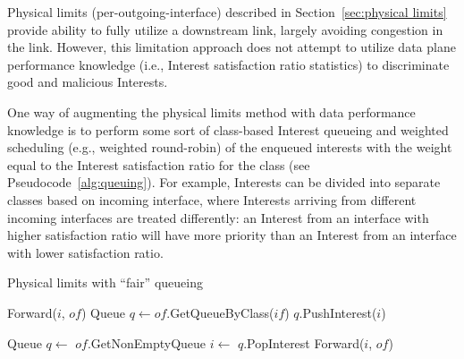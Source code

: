 
Physical limits (per-outgoing-interface) described in Section~\ref{sec:physical limits} provide ability to fully utilize a downstream link, largely avoiding congestion in the link.
However, this limitation approach does not attempt to utilize data plane performance knowledge (i.e., Interest satisfaction ratio statistics) to discriminate good and malicious Interests.

One way of augmenting the physical limits method with data performance knowledge is to perform some sort of class-based Interest queueing and weighted scheduling (e.g., weighted round-robin) of the enqueued interests with the weight equal to the Interest satisfaction ratio for the class (see Pseudocode~\ref{alg:queuing}).
For example, Interests can be divided into separate classes based on incoming interface, where Interests arriving from different incoming interfaces are treated differently:
an Interest from an interface with higher satisfaction ratio will have more priority than an Interest from an interface with lower satisfaction ratio.



\begin{algorithm}[h]
\caption{Physical limits with ``fair'' queueing}
\label{alg:queuing}
\begin{algorithmic}[1]
        \State Forward($i$, $of$)
    \Else
        \State Queue $q \leftarrow of$.GetQueueByClass($if$)
        \State $q$.PushInterest($i$)
    \EndIf
\EndFor
\EndFunction

\vspace{0.2cm}
\State{} 
    \State{} 
    \State Queue $q \leftarrow$ $of$.GetNonEmptyQueue 
    \State $i \leftarrow$ $q$.PopInterest
    \State Forward($i$, $of$)
\EndFunction
\end{algorithmic}
\end{algorithm}

